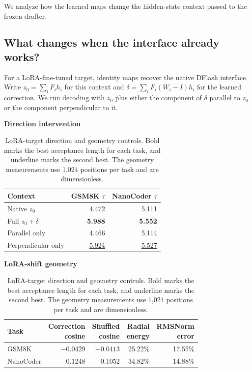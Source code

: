 We analyze how the learned maps change the hidden-state context passed to the frozen drafter.

\subsection{What changes when the interface already works?}
\label{sec:analysis-lora}

For a LoRA-fine-tuned target, identity maps recover the native DFlash interface. Write $z_0=\sum_i F_i h_i$ for this context and $\delta=\sum_i F_i(W_i-I)h_i$ for the learned correction. We run decoding with $z_0$ plus either the component of $\delta$ parallel to $z_0$ or the component perpendicular to it.

\begin{table}[ht!]
\centering
\caption{LoRA-target direction and geometry controls. Bold marks the best acceptance length for each task, and underline marks the second best. The geometry measurements use 1,024 positions per task and are dimensionless.}
\label{tab:key-interventions}
\begin{minipage}[t]{0.43\linewidth}
\vspace{0pt}
\centering
\scriptsize
\textbf{Direction intervention}\par\smallskip
\begin{tabular}{@{}lrr@{}}
\toprule
Context & GSM8K $\tau$ & NanoCoder $\tau$ \\
\midrule
Native $z_0$ & 4.472 & 5.111 \\
Full $z_0+\delta$ & \textbf{5.988} & \textbf{5.552} \\
Parallel only & 4.466 & 5.114 \\
Perpendicular only & \underline{5.924} & \underline{5.527} \\
\bottomrule
\end{tabular}
\end{minipage}\hfill
\begin{minipage}[t]{0.54\linewidth}
\vspace{0pt}
\centering
\scriptsize
\textbf{LoRA-shift geometry}\par\smallskip
\setlength{\tabcolsep}{2pt}
\begin{tabular}{@{}lrrrr@{}}
\toprule
Task & \shortstack{Correction\\cosine} & \shortstack{Shuffled\\cosine} & \shortstack{Radial\\energy} & \shortstack{RMSNorm\\error} \\
\midrule
GSM8K & $-0.0429$ & $-0.0413$ & 25.22\% & 17.55\% \\
NanoCoder & 0.1248 & 0.1052 & 34.82\% & 14.88\% \\
\bottomrule
\end{tabular}
\end{minipage}
\end{table}

